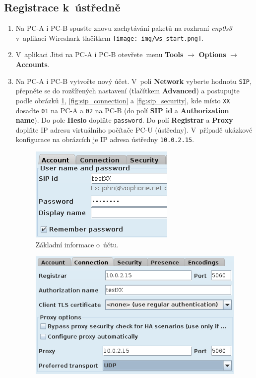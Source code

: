 \subsection{Registrace k~ústředně}
\begin{enumerate}
    \item Na PC-A i PC-B spusťte znovu zachytávání paketů na rozhraní \emph{enp0s3} v aplikaci Wireshark tlačítkem \texttt{[image: img/ws\_start.png]}.
    \item V~aplikaci Jitsi na PC-A i PC-B otevřete menu {\bf Tools} $\rightarrow$ {\bf Options} $\rightarrow$ {\bf Accounts}.
    \item Na PC-A i PC-B vytvořte nový účet. V~poli {\bf Network} vyberte hodnotu {\tt SIP}, přepněte se do rozšířených nastavení (tlačítkem {\bf Advanced}) a postupujte podle obrázků \ref{fig:sip_account}, \ref{fig:sip_connection} a \ref{fig:sip_security}, kde místo {\tt XX} dosaďte \texttt{01} na PC-A a \texttt{02} na PC-B (do polí \textbf{SIP id} a \textbf{Authorization name}).
	Do pole \textbf{Heslo} doplňte \texttt{password}. Do polí \textbf{Registrar} a \textbf{Proxy} doplňte IP adresu virtuálního počítače PC-U (ústředny). V~případě ukázkové konfigurace na obrázcích je IP adresa ústředny \texttt{10.0.2.15}.\\
\begin{figure}[H]
  \centering
  \includegraphics[scale=1]{img/sip_account.png}
  \caption{Základní informace o~účtu.}
  \label{fig:sip_account}
\end{figure}
\begin{figure}[H]
  \centering
  \includegraphics[scale=1]{img/sip_connection.png}

\end{figure}
\end{enumerate}

